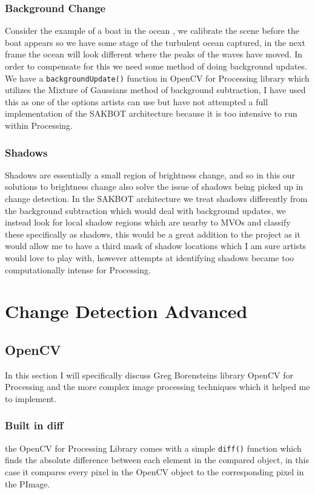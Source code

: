 \documentclass[a4paper]{report}
\begin{document}
\subsection{Background Change}
Consider the example of a boat in the ocean , we calibrate the scene before the boat appears so we have some stage of the turbulent ocean captured, in the next frame the ocean will look different where the peaks of the waves have moved. In order to compensate for this we need some method of doing background updates. We have a \verb|backgroundUpdate()| function in OpenCV for Processing library\cite{OPENCV} which utilizes the Mixture of Gaussians method of background subtraction, I have used this as one of the options artists can use but have not attempted a full implementation of the SAKBOT architecture\cite{SAKBOT} because it is too intensive to run within Processing\cite{PROCESSING}.

\subsection{Shadows}
Shadows are essentially a small region of brightness change, and so in this our solutions to brightness change also solve the issue of shadows being picked up in change detection. In the SAKBOT architecture\cite{SAKBOT} we treat shadows differently from the background subtraction which would deal with background updates, we instead look for local shadow regions which are nearby to MVOs and classify these specifically as shadows, this would be a great addition to the project as it would allow me to have a third mask of shadow locations which I am sure artists would love to play with, however attempts at identifying shadows became too computationally intense for Processing\cite{PROCESSING}.

\chapter{Change Detection Advanced}
\section{OpenCV}
In this section I will specifically discuss Greg Borensteins library OpenCV for Processing \cite{OPENCV} and the more complex image processing techniques which it helped me to implement.

\subsection{Built in diff}
the OpenCV for Processing Library comes with a simple \verb|diff()| function which finds the absolute difference between each element in the compared object, in this case it compares every pixel in the OpenCV object to the corresponding pixel in the PImage.
\end{document}
